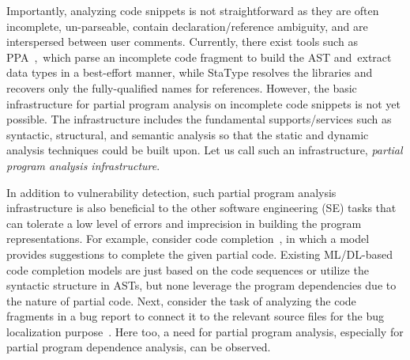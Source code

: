 

Importantly, analyzing code snippets is not straightforward as they
are often incomplete, un-parseable, contain declaration/reference
ambiguity, and are interspersed between user comments. Currently,
there exist tools such as PPA~\cite{ppa08},~which parse an incomplete
code fragment to build the AST and~ex\-tract data types in a
best-effort manner, while StaType \cite{icse18} resolves the libraries
and recovers only the fully-qualified names for references. However,
the basic infrastructure for partial program analysis on incomplete
code snippets is not yet possible. The infrastructure includes the
fundamental supports/services such as syntactic, structural, and
semantic analysis so that the static and dynamic analysis techniques
could be built upon. Let us call such an infrastructure, {\em partial
program analysis infrastructure}.

In addition to vulnerability detection, such partial program analysis
infrastructure is also beneficial to the other software engineering
(SE) tasks that can tolerate a low level of errors and imprecision in
building the program representations. For example, consider code
completion~\cite{codefill-icse22,facebook-icse21}, in which a model
provides suggestions to complete the given partial code. Existing
ML/DL-based code completion models are just based on the code
sequences or utilize the syntactic structure in ASTs, but none
leverage the program dependencies due to the nature of partial
code. Next, consider the task of analyzing the code fragments in a bug
report to connect it to the relevant source files for the bug localization
purpose~\cite{euler-fse19,icpc17}. Here too, a need for partial
program analysis, especially for partial program dependence analysis,
can be observed.









